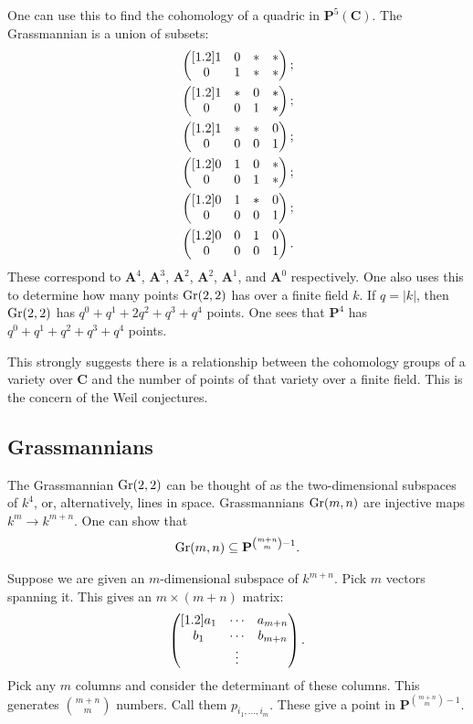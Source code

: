 \documentclass [11 pt, oneside, margin = 1 in] {article}
\begin{document}
One can use this to find the cohomology of a quadric in $\mathbf{P}^5(\mathbf{C})$. The Grassmannian is a union of subsets:
\begin{align*}
	&\begin{pmatrix} [ 1.2 ] 1&0&*&*\\0&1&*&*\end{pmatrix};\\
	&\begin{pmatrix} [ 1.2 ] 1&*&0&*\\0&0&1&*\end{pmatrix};\\
	&\begin{pmatrix} [ 1.2 ] 1&*&*&0\\0&0&0&1\end{pmatrix};\\
	&\begin{pmatrix} [ 1.2 ] 0&1&0&*\\0&0&1&*\end{pmatrix};\\
	&\begin{pmatrix} [ 1.2 ] 0&1&*&0\\0&0&0&1\end{pmatrix};\\
	&\begin{pmatrix} [ 1.2 ] 0&0&1&0\\0&0&0&1\end{pmatrix}.
\end{align*}
These correspond to $\mathbf{A}^4$, $\mathbf{A}^3$, $\mathbf{A}^2$, $\mathbf{A}^2$, $\mathbf{A}^1$, and $\mathbf{A}^0$ respectively. One also uses this to determine how many points $\operatorname{Gr}(2,2)$ has over a finite field $k$. If $q=\left\lvert k \right\rvert $, then $\operatorname{Gr}(2,2)$ has $q^0 + q^1 + 2q^2 + q^3+q^4$ points. One sees that $\mathbf{P}^4$ has $q^0+q^1+q^2+q^3+q^4$ points.

This strongly suggests there is a relationship between the cohomology groups of a variety over $\mathbf{C}$ and the number of points of that variety over a finite field. This is the concern of the Weil conjectures.

\subsection{Grassmannians}
The Grassmannian $\operatorname{Gr}(2,2)$ can be thought of as the two-dimensional subspaces of $k^4$, or, alternatively, lines in space. Grassmannians $\operatorname{Gr}(m,n)$ are injective maps $k^m \longrightarrow k^{m+n}$.
One can show that
\begin{align*}
	\operatorname{Gr}(m,n) \subseteq  \mathbf{P}^{\binom{m+n}{m}-1}.
\end{align*}

Suppose we are given an $m$-dimensional subspace of $k^{m+n}$. Pick $m$ vectors spanning it. This gives an $m\times(m+n)$ matrix:
\begin{align*}
	\begin{pmatrix} [ 1.2 ] a_1&\cdots &a_{m+n}\\b_1&\cdots &b_{m+n}\\&\vdots\end{pmatrix}.
\end{align*}
Pick any $m$ columns and consider the determinant of these columns. This generates $\binom{m+n}{m}$ numbers. Call them $p_{{i_1},\hdots,{i_m}}$. These give a point in $\mathbf{P}^{\binom{m+n}{m} - 1}$. 
\end{document}
